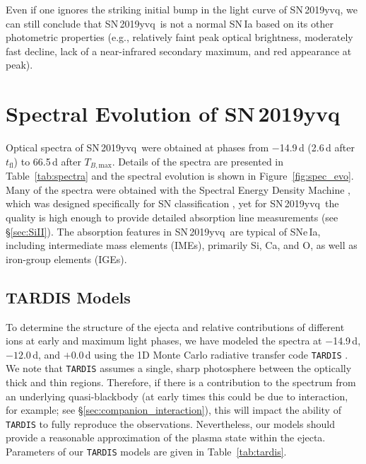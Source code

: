 \documentclass[twocolumn]{aastex63}
\newcommand{\tfl}{$t_\mathrm{fl}$}
\newcommand{\tbmax}{$T_{B,\mathrm{max}}$}
\newcommand{\sn}{SN\,2019yvq}
\begin{document}
Even if one ignores the striking initial bump in the light curve of \sn, we
can still conclude that \sn\ is not a normal SN\,Ia based on its other
photometric properties (e.g., relatively faint peak optical brightness,
moderately fast decline, lack of a near-infrared secondary maximum, and red
appearance at peak).

\section{Spectral Evolution of \sn}\label{sec:spec}

Optical spectra of \sn\ were obtained at phases from $-$14.9\,d (2.6\,d after
\tfl) to 66.5\,d after \tbmax. Details of the spectra are presented in
Table~\ref{tab:spectra} and the spectral evolution is shown in
Figure~\ref{fig:spec_evo}. Many of the spectra were obtained with the Spectral
Energy Density Machine \citep[SEDM;][]{Blagorodnova18,Rigault19}, which was
designed specifically for SN classification \citep[e.g.,][]{Fremling19a}, yet
for \sn\ the quality is high enough to provide detailed absorption line
measurements (see \S\ref{sec:SiII}). The absorption features in \sn\ are
typical of SNe\,Ia, including intermediate mass elements (IMEs), primarily Si,
Ca, and O, as well as iron-group elements (IGEs).

\subsection{TARDIS Models}\label{sec:tardis}

To determine the structure of the ejecta and relative contributions of
different ions at early and maximum light phases, we have modeled the spectra
at $-$14.9\,d, $-12.0$\,d, and $+$0.0\,d using the 1D Monte Carlo radiative
transfer code \texttt{TARDIS} \citep{Kerzendorf14}. We note that
\texttt{TARDIS} assumes a single, sharp photosphere between the optically
thick and thin regions. Therefore, if there is a contribution to the spectrum
from an underlying quasi-blackbody (at early times this could be due to
interaction, for example; see \S\ref{sec:companion_interaction}), this will
impact the ability of \texttt{TARDIS} to fully reproduce the observations.
Nevertheless, our models should provide a reasonable approximation of the
plasma state within the ejecta. Parameters of our \texttt{TARDIS} models are
given in Table~\ref{tab:tardis}.


\end{document}
